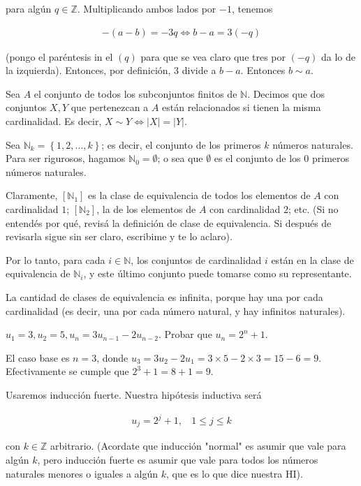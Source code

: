 \documentclass[a4paper, 12pt]{article}
\begin{document}
para algún $q \in \mathbb{Z}$. Multiplicando ambos lados por $-1$, tenemos 

\begin{align*}
    -(a - b) = -3q \iff b - a = 3(-q)
\end{align*}

(pongo el paréntesis in el $(q)$ para que se vea claro que tres por $(-q)$ da
lo de la izquierda). Entonces, por definición, $3$ divide a $b - a$. Entonces $b \sim a$.


\pagebreak 

Sea $A$ el conjunto de todos los subconjuntos finitos de $\mathbb{N}$. Decimos
que dos conjuntos $X, Y$ que pertenezcan a $A$ están relacionados si tienen la
misma cardinalidad. Es decir, $X \sim Y \iff |X| = |Y|$.

Sea $\mathbb{N}_k = \left\{ 1, 2, \ldots, k \right\} $; es decir, el conjunto
de los primeros $k$ números naturales. Para ser rigurosos, hagamos
$\mathbb{N}_0 = \emptyset$; o sea que $\emptyset$ es el conjunto de los $0$
primeros números naturales.

Claramente, $[\mathbb{N}_1]$ es la clase de equivalencia de todos los elementos
de $A$ con cardinalidad $1$; $[\mathbb{N}_2]$, la de los elementos de $A$ con
cardinalidad $2$; etc. (Si no entendés por qué, revisá la definición de clase
de equivalencia. Si después de revisarla sigue sin ser claro, escribime y te lo
aclaro).

Por lo tanto, para cada $i \in \mathbb{N}$, los conjuntos de cardinalidad $i$
están en la clase de equivalencia de $\mathbb{N}_i$, y este último 
conjunto puede tomarse como su representante.

La cantidad de clases de equivalencia es infinita, porque hay una 
por cada cardinalidad (es decir, una por cada número natural,
y hay infinitos naturales).

\pagebreak 

$u_1 = 3, u_2 = 5, u_n = 3u_{n-1} - 2 u_{n-2}$. Probar que $u_n = 2^n + 1$.

El caso base es $n = 3$, donde $u_3 = 3u_2 - 2u_1 = 3 \times 5 - 2 \times 3 =
15 - 6 = 9$. Efectivamente se cumple que $2^3 + 1 = 8 + 1 = 9$.

Usaremos inducción fuerte. Nuestra hipótesis inductiva será 

\begin{align*}
    u_j = 2^j + 1, ~ ~ ~ ~ 1 \leq j \leq k
\end{align*}

con $k \in \mathbb{Z}$ arbitrario. (Acordate que inducción "normal" es asumir 
que vale para algún $k$, pero inducción fuerte es asumir que vale 
para todos los números naturales menores o iguales a algún $k$, que 
es lo que dice nuestra HI).
\end{document}

